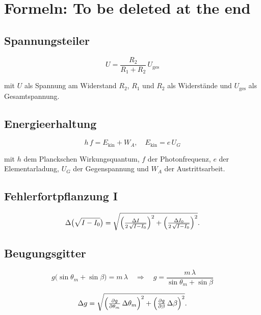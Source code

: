 \chapter{Formeln: To be deleted at the end}

\section*{Spannungsteiler}

\begin{equation}
  U = \frac{R_2}{R_1 + R_2}\,U_{\mathrm{ges}}
\end{equation}

mit $U$ als Spannung am Widerstand $R_2$, $R_1$ und $R_2$ als Widerstände und $U_{\mathrm{ges}}$ als Gesamtspannung.

\section*{Energieerhaltung}

\begin{equation}
  h\,f = E_{\mathrm{kin}} + W_A,
  \quad
  E_{\mathrm{kin}} = e\,U_G
\end{equation}

mit $h$ dem Planckschen Wirkungsquantum, $f$ der Photonfrequenz, $e$ der Elementarladung, $U_G$ der Gegenspannung und $W_A$ der Austrittsarbeit.

\section*{Fehlerfortpflanzung I}

\begin{equation}
  \Delta\bigl(\sqrt{I - I_0}\bigr)
  = \sqrt{
    \Bigl(\tfrac{\Delta I}{2\,\sqrt{I - I_0}}\Bigr)^{2}
   +\Bigl(\tfrac{\Delta I_0}{2\,\sqrt{I - I_0}}\Bigr)^{2}
  }.
\end{equation}

\section*{Beugungsgitter}

\begin{equation}
  g\bigl(\sin\theta_m + \sin\beta\bigr) = m\,\lambda
  \quad\Longrightarrow\quad
  g = \frac{m\,\lambda}{\sin\theta_m + \sin\beta}
\end{equation}

\begin{equation}
  \Delta g
  = \sqrt{
    \Bigl(\tfrac{\partial g}{\partial\theta_m}\,\Delta\theta_m\Bigr)^{2}
   +\Bigl(\tfrac{\partial g}{\partial\beta}\,\Delta\beta\Bigr)^{2}
  }.
\end{equation}

